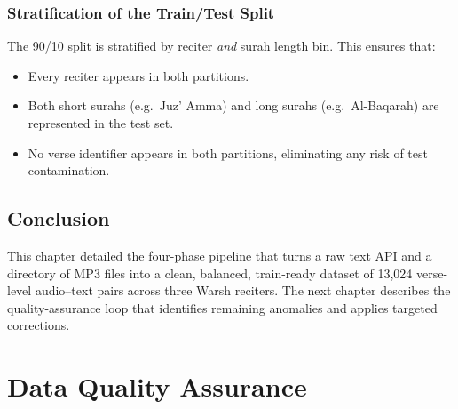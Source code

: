 \documentclass[12pt,a4paper]{report}
\begin{document}
\subsection{Stratification of the Train/Test Split}

The 90/10 split is stratified by reciter \emph{and} surah length bin.
This ensures that:
\begin{itemize}
  \item Every reciter appears in both partitions.
  \item Both short surahs (e.g.\ Juz' Amma) and long surahs (e.g.\
        Al-Baqarah) are represented in the test set.
  \item No verse identifier appears in both partitions, eliminating any
        risk of test contamination.
\end{itemize}

\section{Conclusion}

This chapter detailed the four-phase pipeline that turns a raw text API
and a directory of MP3 files into a clean, balanced, train-ready dataset
of 13{,}024 verse-level audio--text pairs across three Warsh reciters.
The next chapter describes the quality-assurance loop that identifies
remaining anomalies and applies targeted corrections.

\chapter{Data Quality Assurance}
\label{ch:mt_qa}
\end{document}

